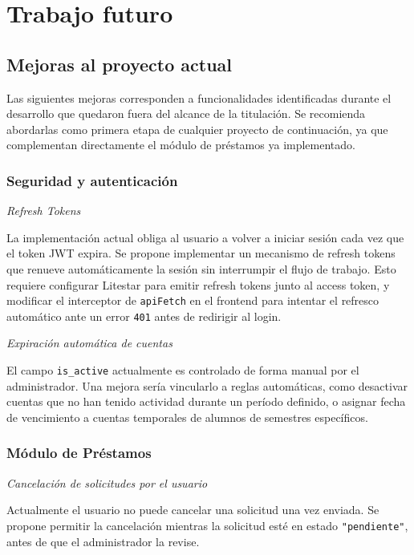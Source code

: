 \section{Trabajo futuro}\label{sec:trabajo_futuro}

\subsection{Mejoras al proyecto actual}\label{sec:mejorar_proyecto_actual}

Las siguientes mejoras corresponden a funcionalidades identificadas durante el 
desarrollo que quedaron fuera del alcance de la titulación. Se recomienda abordarlas 
como primera etapa de cualquier proyecto de continuación, ya que complementan 
directamente el módulo de préstamos ya implementado.

\subsubsection*{Seguridad y autenticación}

\emph{Refresh Tokens}

La implementación actual obliga al usuario a volver a iniciar sesión cada vez que el 
token JWT expira. Se propone implementar un mecanismo de refresh tokens que renueve 
automáticamente la sesión sin interrumpir el flujo de trabajo. Esto requiere 
configurar Litestar para emitir refresh tokens junto al access token, y modificar el 
interceptor de \texttt{apiFetch} en el frontend para intentar el refresco automático 
ante un error \texttt{401} antes de redirigir al login.

\emph{Expiración automática de cuentas}

El campo \texttt{is\_active} actualmente es controlado de forma manual por el 
administrador. Una mejora sería vincularlo a reglas automáticas, como desactivar 
cuentas que no han tenido actividad durante un período definido, o asignar fecha de 
vencimiento a cuentas temporales de alumnos de semestres específicos.

\subsubsection*{Módulo de Préstamos}

\emph{Cancelación de solicitudes por el usuario}

Actualmente el usuario no puede cancelar una solicitud una vez enviada. Se propone 
permitir la cancelación mientras la solicitud esté en estado \texttt{"pendiente"}, 
antes de que el administrador la revise.

